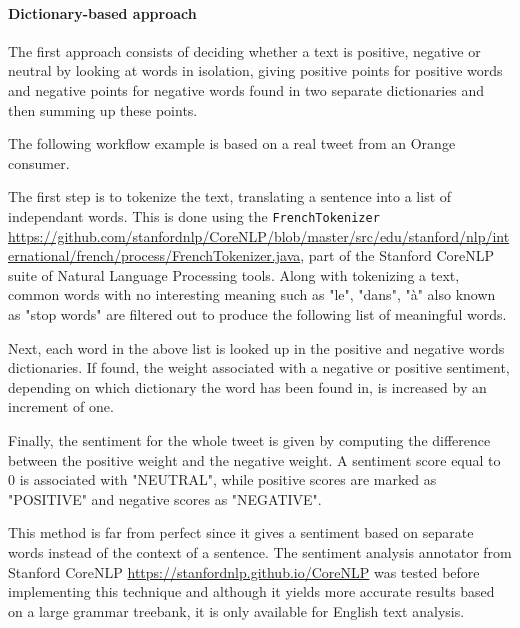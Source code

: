 \documentclass[11pt]{article}
\begin{document}

\paragraph{Dictionary-based approach}

The first approach consists of deciding whether a text is positive, negative or neutral by looking at words in isolation, giving positive points for positive words and negative points for negative words found in two separate dictionaries and then summing up these points.

The following workflow example is based on a real tweet from an Orange consumer.


The first step is to tokenize the text, translating a sentence into a list of independant words. This is done using the \texttt{FrenchTokenizer} \url{https://github.com/stanfordnlp/CoreNLP/blob/master/src/edu/stanford/nlp/international/french/process/FrenchTokenizer.java}, part of the Stanford CoreNLP suite of Natural Language Processing tools. Along with tokenizing a text, common words with no interesting meaning such as "le", "dans", "à" also known as "stop words" are filtered out to produce the following list of meaningful words.


Next, each word in the above list is looked up in the positive and negative words dictionaries. If found, the weight associated with a negative or positive sentiment, depending on which dictionary the word has been found in, is increased by an increment of one.

Finally, the sentiment for the whole tweet is given by computing the difference between the positive weight and the negative weight. A sentiment score equal to 0 is associated with "NEUTRAL", while positive scores are marked as "POSITIVE" and negative scores as "NEGATIVE".

This method is far from perfect since it gives a sentiment based on separate words instead of the context of a sentence. The sentiment analysis annotator from Stanford CoreNLP \url{https://stanfordnlp.github.io/CoreNLP} was tested before implementing this technique and although it yields more accurate results based on a large grammar treebank, it is only available for English text analysis.
\end{document}
